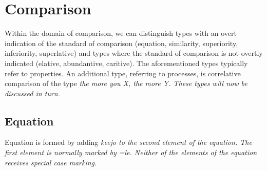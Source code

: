 

%
%


\section{Comparison}\label{sec:func:Comparison}
Within the domain of comparison, we can distinguish types with an overt indication of the standard of comparison (equation, similarity, superiority, inferiority, superlative) and types where the standard of comparison is not overtly indicated  (elative, abundantive, caritive). The aforementioned types typically refer to properties. An additional type, referring to processes, is correlative comparison of the type \em the more you X, the more Y\em. These types will now be discussed in turn.


\subsection{Equation}\label{sec:func:Equation}

Equation is formed by adding \em keejo \em to the second element of the equation. The first element is normally marked by \em =le\em. Neither of the elements of the equation receives special case marking.


